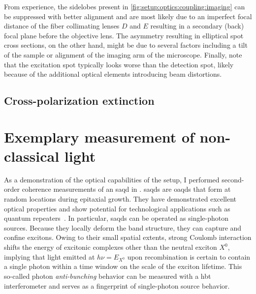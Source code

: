 From experience, the sidelobes present in \cref{fig:setup:optics:coupling:imaging} can be suppressed with better alignment and are most likely due to an imperfect focal distance of the fiber collimating lenses $D$ and $E$ resulting in a secondary (back) focal plane before the objective lens.
The asymmetry resulting in elliptical spot cross sections, on the other hand, might be due to several factors including a tilt of the sample or alignment of the imaging arm of the microscope.
Finally, note that the excitation spot typically looks worse than the detection spot, likely because of the additional optical elements introducing beam distortions.

\subsection{Cross-polarization extinction}\label{subsec:setup:optics:coupling:rejection}

\section{Exemplary measurement of non-classical light}\label{sec:setup:optics:g2}
As a demonstration of the optical capabilities of the setup, I performed second-order coherence measurements of an  \gls{saqd} in .
\Glspl{saqd} are \glspl{oaqd} that form at random locations during epitaxial growth.
They have demonstrated excellent optical properties and show potential for technological applications such as quantum repeaters~\cite{Petroff2001,Warburton2013,Lodahl2015,Zajac2025}.
In particular, \glspl{saqd} can be operated as single-photon sources.
Because they locally deform the band structure, they can capture and confine excitons.
Owing to their small spatial extents, strong Coulomb interaction shifts the energy of excitonic complexes other than the neutral exciton $X^{0}$, implying that light emitted at $h\nu = E_{X^{0}}$ upon recombination is certain to contain a single photon within a time window on the scale of the exciton lifetime.
This so-called photon \emph{anti-bunching} behavior
can be measured with a \gls{hbt} interferometer and serves as a fingerprint of single-photon source behavior.

